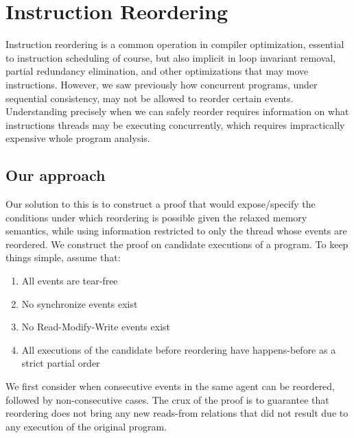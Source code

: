 


\section{Instruction Reordering}
    Instruction reordering is a common operation in compiler optimization, essential to 
    instruction scheduling of course, but also implicit in loop invariant removal, partial redundancy
    elimination, and other optimizations that may move instructions.
    However, we saw previously how concurrent programs, under sequential consistency, may not be allowed to reorder certain events. Understanding precisely when we can safely reorder requires information on what instructions threads may be executing concurrently, which requires impractically expensive whole program analysis.
    
    \subsection{Our approach}
    Our solution to this is to construct a proof that would expose/specify the conditions under which reordering is possible given the relaxed memory semantics, while using information restricted to only the thread whose events are reordered.  We construct the proof on candidate executions of a program. To keep things simple, assume that: 
    
    \begin{enumerate}
        \item All events are tear-free
        \item No synchronize events exist
        \item No Read-Modify-Write events exist
        \item All executions of the candidate before reordering have happens-before as a strict partial order
    \end{enumerate}
    
    We first consider when consecutive events in the same agent can be reordered, followed by non-consecutive cases. The crux of the proof is to guarantee that reordering does not bring any new reads-from relations that did not result due to any execution of the original program. 



